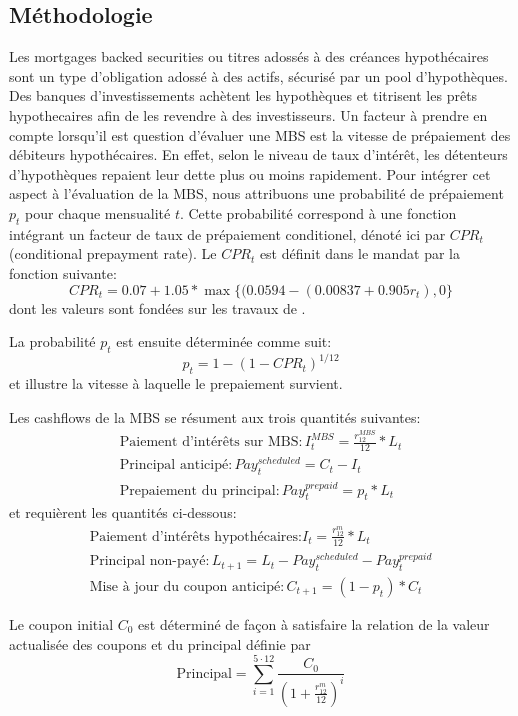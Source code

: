 \subsection*{Méthodologie}
Les mortgages backed securities ou titres adossés à des créances hypo\-thécaires sont un
type d'obli\-gation adossé à des actifs, sécurisé par un pool d'hypothèques. Des banques
d'investis\-sements achètent les hypothèques et titrisent les prêts hypothecaires afin de
les revendre à des investisseurs.  Un facteur à prendre en compte lorsqu'il est question
d'évaluer une MBS est la vitesse de prépaiement des débiteurs hypothécaires. En effet,
selon le niveau de taux d'intérêt, les détenteurs d'hypothèques repaient leur dette plus
ou moins rapidement. Pour intégrer cet aspect à l'évaluation de la MBS, nous attribuons
une probabilité de prépaiement $p_t$ pour chaque mensualité $t$. Cette probabilité
correspond à une fonction intégrant un facteur de taux de prépaiement conditionel, dénoté
ici par $CPR_t$ (conditional prepayment rate). Le $CPR_t$ est définit dans le mandat par
la fonction suivante:
\[
CPR_t= 0.07+1.05*\max\{(0.0594-(0.00837+0.905r_t),0\}
\]
dont les valeurs sont fondées sur les travaux de \cite{chernov2016macroeconomic}.

La probabilité $p_t$ est ensuite déterminée comme suit: 
\[
p_t=1-(1-CPR_t)^{1/12}
\]
et illustre la vitesse à laquelle le prepaiement survient. 

Les cashflows de la MBS se résument aux trois quantités suivantes:
\begin{gather*}
\text{Paiement d'intérêts sur MBS}: I_t^{MBS}=\frac{r_{12}^{MBS}}{12}*L_t \\
\text{Principal anticipé}: Pay_t^{scheduled}=C_t-I_t \\
\text{Prepaiement du principal}: Pay_t^{prepaid}=p_t*L_t
\end{gather*}
et requièrent les quantités ci-dessous:
\begin{gather*}
\text{Paiement d'intérêts hypothécaires:} I_t=\frac{r_{12}^{m}}{12}*L_t \\
\text{Principal non-payé}: L_{t+1}=L_t-Pay_t^{scheduled}-Pay_t^{prepaid} \\
\text{Mise à jour du coupon anticipé}: C_{t+1}=(1-p_t)*C_t
\end{gather*}

Le coupon initial $C_0$ est déterminé de façon à satisfaire la relation de la valeur actualisée des coupons et du principal définie par
\[
\text{Principal}=\sum_{i=1}^{5\cdot 12} \frac{C_0}{\left(1+\frac{r_{12}^{m}}{12}\right)^i}
\]

